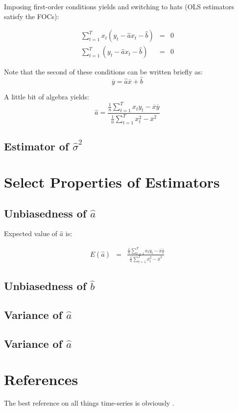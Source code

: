 \documentclass[12pt]{article}
\begin{document}
Imposing first-order conditions yields and switching to hats (OLS estimators satisfy the FOCs):

\begin{eqnarray}
\sum_{t=1}^{T}x_t (y_t - \hat{a} x_t - \hat{b}) &=&  0 \\
\sum_{t=1}^{T} (y_t - \hat{a} x_t - \hat{b}) &=& 0
\end{eqnarray}

Note that the second of these conditions can be written briefly as:
\begin{equation}
\overline{y} = \hat{a} \overline{x} + \hat{b}
\end{equation}

A little bit of algebra yields:
\begin{equation}
\hat{a} = \frac{\frac{1}{n}\sum\limits_{t=1}^{T}x_t y_t - \overline{x} \overline{y}}
{\frac{1}{n}\sum\limits_{t=1}^{T}x_t^2 - \overline{x}^2}
\end{equation}

\subsection{Estimator of $\hat{\sigma}^2$}


\section{Select Properties of Estimators}

\subsection{Unbiasedness of $\hat{a}$}
Expected value of $\hat{a}$ is:

\begin{eqnarray}
E(\hat{a}) &=& \frac{\frac{1}{n}\sum\limits_{t=1}^{T}x_t y_t - \overline{x} \overline{y}}{\frac{1}{n}\sum\limits_{t=1}^{T}x_t^2 - \overline{x}^2}
\end{eqnarray}

\subsection{Unbiasedness of $\hat{b}$}

\subsection{Variance of $\hat{a}$}
\subsection{Variance of $\hat{a}$}


\section{References}
The best reference on all things time-series is obviously \cite{hamilton_tsa}. 




\end{document}
